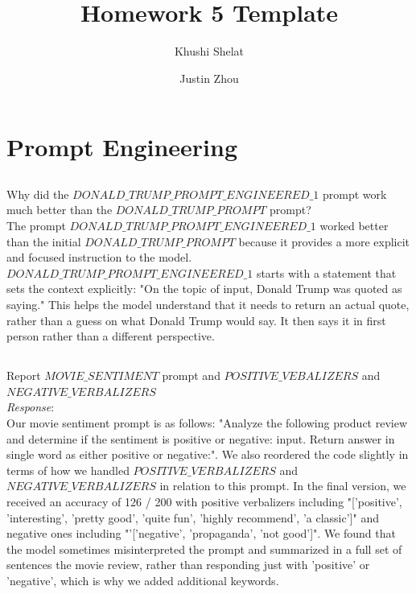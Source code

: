 \documentclass{article}
\title{Homework 5 Template}
\author{Khushi Shelat  \and Justin Zhou}
\date{}
\begin{document}
\maketitle
\thispagestyle{empty}
\pagestyle{empty}

\section{Prompt Engineering}
\subsection{}
Why did the $DONALD\_TRUMP\_PROMPT\_ENGINEERED\_1$ prompt work much better than the $DONALD\_TRUMP\_PROMPT$ prompt?\\ 

The prompt $DONALD\_TRUMP\_PROMPT\_ENGINEERED\_1$ worked better than the initial $DONALD\_TRUMP\_PROMPT$ because it provides a more explicit and focused instruction to the model. $DONALD\_TRUMP\_PROMPT\_ENGINEERED\_1$ starts with a statement that sets the context explicitly: "On the topic of {input}, Donald Trump was quoted as saying." This helps the model understand that it needs to return an actual quote, rather than a guess on what Donald Trump would say. It then says it in first person rather than a different perspective. 

\subsection{}


Report $MOVIE\_SENTIMENT$ prompt and $POSITIVE\_VEBALIZERS$ and\\ $NEGATIVE\_VERBALIZERS$\\
\emph{Response}: \\ 

Our movie sentiment prompt is as follows: "Analyze the following product review and determine if the sentiment is positive or negative: {input}. Return answer in single word as either positive or negative:". We also reordered the code slightly in terms of how we handled $POSITIVE\_VERBALIZERS$ and $NEGATIVE\_VERBALIZERS$ in relation to this prompt. In the final version, we received an accuracy of 126 / 200 with positive verbalizers including "['positive', 'interesting', 'pretty good', 'quite fun', 'highly recommend', 'a classic']" and negative ones including "'['negative', 'propaganda', 'not good']". We found that the model sometimes misinterpreted the prompt and summarized in a full set of sentences the movie review, rather than responding just with 'positive' or 'negative', which is why we added additional keywords. 
\end{document}

